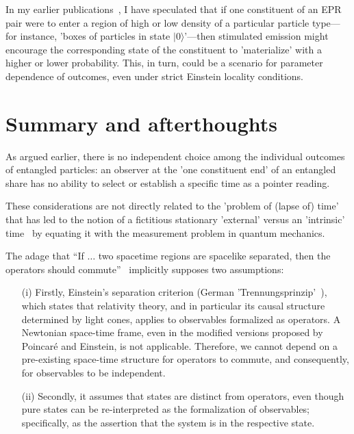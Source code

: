 \documentclass[%
  reprint,
 showpacs,
 showkeys,
 preprintnumbers,
 nofootinbib,
 amsmath,amssymb,
 aps,
 pra,
  longbibliography,
 ]{revtex4-2}
\begin{document}
In my earlier publications~\cite{svozil-slash}, I have speculated that if one constituent of an EPR pair were to enter a region
of high or low density of a particular particle type---for instance, 'boxes of particles in state $\vert 0 \rangle$'---then stimulated emission might
encourage the corresponding state of the constituent to 'materialize' with a higher or lower probability.
This, in turn, could be a scenario for parameter dependence of outcomes, even under strict Einstein locality conditions.


\section{Summary and afterthoughts}

As argued earlier, there is no independent choice among the individual outcomes of entangled particles:
an observer at the 'one constituent end' of an entangled share has no ability to select or establish a specific time as a pointer reading.

These considerations are not directly related to the 'problem of (lapse of) time' that has led to the notion of a
fictitious stationary 'external' versus an 'intrinsic' time~\cite{Page_1983,Wootters_1984,Moreva_2014}
by equating it with the measurement problem in quantum mechanics.

The adage that ``If $\ldots$ two spacetime regions are spacelike separated,
then the operators should commute''~\cite{Hardy_2007}
implicitly supposes two assumptions:

\begin{itemize}
\item[(i)] Firstly, Einstein's separation criterion (German 'Trennungsprinzip'~\cite[537-539]{Meyenn-2011}),
which states that relativity theory, and in particular its causal structure determined by light cones,
applies to observables formalized as operators.
A Newtonian space-time frame, even in the modified versions proposed by Poincar\'e
and Einstein, is not applicable.
Therefore, we cannot depend on a pre-existing space-time structure for operators to commute,
and consequently, for observables to be independent.

\item[(ii)] Secondly, it assumes that states are distinct from operators, even though
pure states can be re-interpreted as the formalization of observables; specifically, as the assertion that the system is in the respective state.
\end{itemize}
\end{document}
